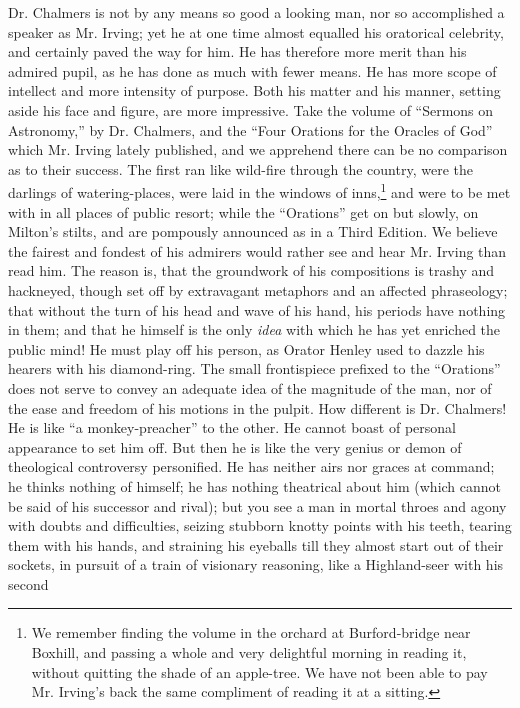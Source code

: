 Dr. Chalmers is not by any means so good a looking man, nor so
accomplished a speaker as Mr. Irving; yet he at one time almost
equalled his oratorical celebrity, and certainly paved the way for
him. He has therefore more merit than his admired pupil, as he has
done as much with fewer means. He has more scope of intellect and
more intensity of purpose. Both his matter and his manner, setting
aside his face and figure, are more impressive. Take the volume of
``Sermons on Astronomy,'' by Dr. Chalmers, and the ``Four Orations
for the Oracles of God'' which Mr. Irving lately published, and we
apprehend there can be no comparison as to their success. The
first ran like wild-fire through the country, were the darlings of
watering-places, were laid in the windows of inns,\footnote{We remember finding the volume in the orchard at
Burford-bridge near Boxhill, and passing a whole and very
delightful morning in reading it, without quitting the shade of an
apple-tree.  We have not been able to pay Mr. Irving's back the
same compliment of reading it at a sitting.} and were to
be met with in all places of public resort; while the ``Orations''
get on but slowly, on Milton's stilts, and are pompously announced
as in a Third Edition. We believe the fairest and fondest of his
admirers would rather see and hear Mr. Irving than read him. The
reason is, that the groundwork of his compositions is trashy and
hackneyed, though set off by extravagant metaphors and an affected
phraseology; that without the turn of his head and wave of his
hand, his periods have nothing in them; and that he himself is the
only \emph{idea} with which he has yet enriched the public mind! He
must play off his person, as Orator Henley used to dazzle his
hearers with his diamond-ring. The small frontispiece prefixed to
the ``Orations'' does not serve to convey an adequate idea of the
magnitude of the man, nor of the ease and freedom of his motions
in the pulpit. How different is Dr.  Chalmers! He is like ``a
monkey-preacher'' to the other. He cannot boast of personal
appearance to set him off. But then he is like the very genius or
demon of theological controversy personified. He has neither airs
nor graces at command; he thinks nothing of himself; he has
nothing theatrical about him (which cannot be said of his
successor and rival); but you see a man in mortal throes and agony
with doubts and difficulties, seizing stubborn knotty points with
his teeth, tearing them with his hands, and straining his eyeballs
till they almost start out of their sockets, in pursuit of a train
of visionary reasoning, like a Highland-seer with his second
